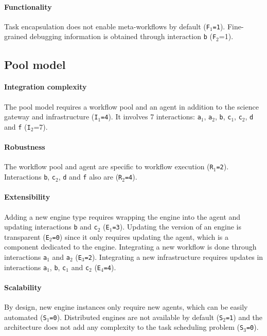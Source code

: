 \documentclass[preprint,3p,twocolumn]{elsarticle}
\newcommand{\correction}[1]{\color{blue}#1\color{black}\xspace}
\begin{document}
\paragraph{\correction{Functionality}} Task encapsulation
\correction{does not enable meta-workflows by default
  (\texttt{\correction{F}$_1$=1})}. Fine-grained debugging information is obtained
through interaction \texttt{b} (\texttt{\correction{F}$_2$}=1).

\subsection{Pool model}

\paragraph{Integration complexity} The pool model requires a workflow pool and an
agent in addition to the science gateway and infrastructure
(\texttt{I$_1$=4}). It involves 7 interactions: \texttt{a$_1$},
\texttt{a$_2$}, \texttt{b}, \texttt{c$_1$}, \texttt{c$_2$}, \texttt{d}
and \texttt{f} (\texttt{I$_2$}=7).

\paragraph{Robustness} The workflow pool and agent are specific to
workflow execution (\texttt{R$_1$=2}). Interactions \texttt{b},
\texttt{c$_2$}, \texttt{d} and \texttt{f} also are (\texttt{R$_2$=4}).

\paragraph{Extensibility} Adding a new engine type requires wrapping
the engine into the agent and updating interactions \texttt{b} and
\texttt{c$_2$} (\texttt{E$_1$=3}). Updating the version of an engine
is transparent (\texttt{E$_2$=0}) since it only requires updating the
agent, which is a component dedicated to the engine. Integrating a new workflow is
done through interactions \texttt{a$_1$} and \texttt{a$_2$}
(\texttt{E$_3$=2}). Integrating a new infrastructure requires updates
in interactions \texttt{a$_1$}, \texttt{b}, \texttt{c$_1$} and \texttt{c$_2$}
(\texttt{E$_4$=4}).

\paragraph{Scalability} By design, new engine instances only require
new agents, which can be easily automated (\texttt{S$_1$=0}). Distributed engines are not available
by default (\texttt{S$_2$=1}) and the architecture does not add any
complexity to the task scheduling problem (\texttt{S$_3$=0}).
\end{document}
